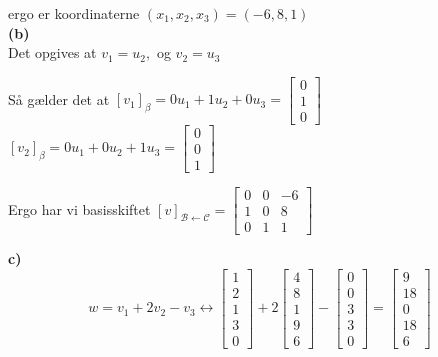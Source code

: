 \documentclass[12pt]{article}
\begin{document}
{ergo er koordinaterne $ (x_1, x_2, x_3) = (-6 , 8, 1)$ \\

\textbf{(b)}\\

Det opgives at $v_1 = u_2,  $ og $ v_2 = u_3$

Så gælder det at
$[v_1]_\beta = 0u_1  + 1u_2 + 0u_3 = \begin{bmatrix}0\\1\\0\end{bmatrix}$\\
$[v_2]_\beta = 0u_1  + 0u_2 + 1u_3 = \begin{bmatrix}0\\0\\1\end{bmatrix}$

Ergo har vi basisskiftet $[v]_{\mathcal{B}  \leftarrow  \mathcal{C} } =\begin{bmatrix}0 & 0 & -6\\1 & 0 & 8\\0 & 1 & 1\end{bmatrix} $


\textbf{c)}\\

\[w = v_1 + 2v_2 - v_3 \leftrightarrow 
\begin{bmatrix}
1 \\ 2\\1\\3\\0
\end{bmatrix} + 2
\begin{bmatrix}
4 \\ 8 \\ 1 \\ 9 \\ 6
\end{bmatrix} -
\begin{bmatrix}
0 \\0 \\3 \\3 \\0
\end{bmatrix}  =
\begin{bmatrix}
9 \\18 \\0 \\18 \\6
\end{bmatrix} 
\]

}
\end{document}
